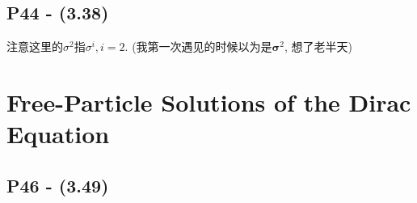 \documentclass[10pt,b5paper,openany]{book}
\begin{document}
\subsection{P44 - (3.38)}

注意这里的$\sigma^2$指$\sigma^i, i=2$. (我第一次遇见的时候以为是$\boldsymbol{\sigma}^2$, 想了老半天)

\section{Free-Particle Solutions of the Dirac Equation}

\subsection{P46 - (3.49)}\label{subsubsec: Boost_u_p}
\end{document}
